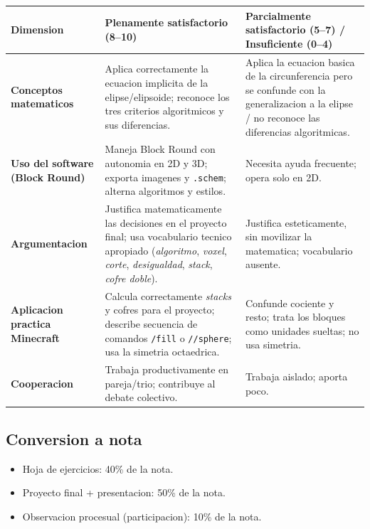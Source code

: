 \documentclass[12pt,a4paper]{scrartcl}
\newcommand{\cmd}[1]{\textcolor{earth}{\texttt{\small #1}}}
\begin{document}
\begin{center}
\small
\begin{tabularx}{\textwidth}{@{}p{}XX@{}}
\toprule
\textbf{Dimension} & \textbf{Plenamente satisfactorio (8--10)} & \textbf{Parcialmente satisfactorio (5--7) / Insuficiente (0--4)} \\
\midrule
\textbf{Conceptos matematicos} & Aplica correctamente la ecuacion implicita de la elipse/elipsoide; reconoce los tres criterios algoritmicos y sus diferencias. & Aplica la ecuacion basica de la circunferencia pero se confunde con la generalizacion a la elipse / no reconoce las diferencias algoritmicas. \\
\addlinespace[3pt]
\textbf{Uso del software (Block Round)} & Maneja Block Round con autonomia en 2D y 3D; exporta imagenes y \texttt{.schem}; alterna algoritmos y estilos. & Necesita ayuda frecuente; opera solo en 2D. \\
\addlinespace[3pt]
\textbf{Argumentacion} & Justifica matematicamente las decisiones en el proyecto final; usa vocabulario tecnico apropiado (\emph{algoritmo}, \emph{voxel}, \emph{corte}, \emph{desigualdad}, \emph{stack}, \emph{cofre doble}). & Justifica esteticamente, sin movilizar la matematica; vocabulario ausente. \\
\addlinespace[3pt]
\textbf{Aplicacion practica Minecraft} & Calcula correctamente \emph{stacks} y cofres para el proyecto; describe secuencia de comandos \cmd{/fill} o \cmd{//sphere}; usa la simetria octaedrica. & Confunde cociente y resto; trata los bloques como unidades sueltas; no usa simetria. \\
\addlinespace[3pt]
\textbf{Cooperacion} & Trabaja productivamente en pareja/trio; contribuye al debate colectivo. & Trabaja aislado; aporta poco. \\
\bottomrule
\end{tabularx}
\end{center}

\subsection{Conversion a nota}
\begin{itemize}[leftmargin=1.3em,itemsep=0.1em,topsep=0.2em,nosep]
  \item Hoja de ejercicios: 40\% de la nota.
  \item Proyecto final + presentacion: 50\% de la nota.
  \item Observacion procesual (participacion): 10\% de la nota.
\end{itemize}
\end{document}
